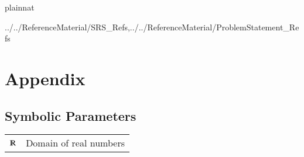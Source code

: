 \documentclass[12pt]{article}
\begin{document}



\newpage

 {plainnat}
 
{../../ReferenceMaterial/SRS_Refs,../../ReferenceMaterial/ProblemStatement_Refs}

\newpage

\section{Appendix}


\subsection{Symbolic Parameters}

\renewcommand{\arraystretch}{1.2}
\begin{tabular}{l l} 		
	$\varmathbb{R}$ & Domain of real numbers\\
\end{tabular}\\
\end{document}
